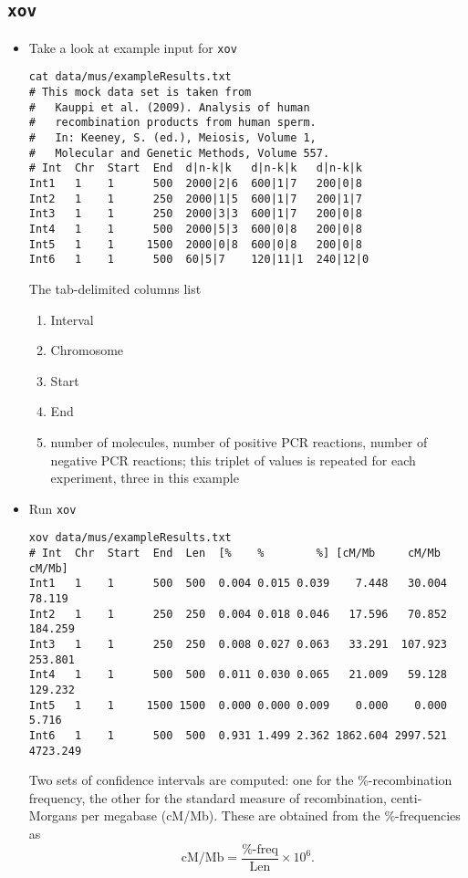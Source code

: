 \documentclass{article}
\newcommand{\ty}{\texttt}
\begin{document}
\begin{itemize}
\subsection{\ty{xov}}
\begin{itemize}
\item Take a look at example input for \ty{xov}
\begin{verbatim}
cat data/mus/exampleResults.txt 
# This mock data set is taken from
#   Kauppi et al. (2009). Analysis of human
#   recombination products from human sperm.
#   In: Keeney, S. (ed.), Meiosis, Volume 1,
#   Molecular and Genetic Methods, Volume 557.
# Int  Chr  Start  End  d|n-k|k   d|n-k|k   d|n-k|k
Int1   1    1      500  2000|2|6  600|1|7   200|0|8
Int2   1    1      250  2000|1|5  600|1|7   200|1|7
Int3   1    1      250  2000|3|3  600|1|7   200|0|8
Int4   1    1      500  2000|5|3  600|0|8   200|0|8
Int5   1    1     1500  2000|0|8  600|0|8   200|0|8
Int6   1    1      500  60|5|7    120|11|1  240|12|0
\end{verbatim}
The tab-delimited columns list
\begin{enumerate}
\item Interval
\item Chromosome
\item Start
\item End
\item number of molecules, number of positive PCR reactions, number of
  negative PCR reactions; this triplet of values is repeated for each
  experiment, three in this example
\end{enumerate}
\item Run \ty{xov}
\small
\begin{verbatim}
xov data/mus/exampleResults.txt
# Int  Chr  Start  End  Len  [%    %        %] [cM/Mb     cM/Mb    cM/Mb]
Int1   1    1      500  500  0.004 0.015 0.039    7.448   30.004   78.119
Int2   1    1      250  250  0.004 0.018 0.046   17.596   70.852  184.259
Int3   1    1      250  250  0.008 0.027 0.063   33.291  107.923  253.801
Int4   1    1      500  500  0.011 0.030 0.065   21.009   59.128  129.232
Int5   1    1     1500 1500  0.000 0.000 0.009    0.000    0.000    5.716
Int6   1    1      500  500  0.931 1.499 2.362 1862.604 2997.521 4723.249
\end{verbatim}
\normalsize
Two sets of confidence intervals are computed: one for the
\%-recombination frequency, the other for the standard measure of
recombination, centi-Morgans per megabase (cM/Mb). These are obtained
from the \%-frequencies as
\[
\mbox{cM/Mb}=\frac{\mbox{\%-freq}}{\mbox{Len}}\times 10^6.
\]
\end{itemize}


\end{itemize}
\end{document}
